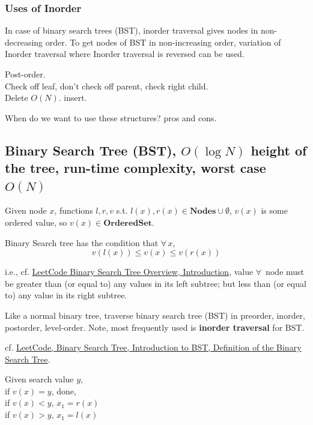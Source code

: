 \documentclass[10pt]{amsart}
\begin{document}
\subsubsection{Uses of Inorder} In case of binary search trees (BST), inorder traversal gives nodes in non-decreasing order. To get nodes of BST in non-increasing order, variation of Inorder traversal where Inorder traversal is reversed can be used.


Post-order. \\
Check off leaf, don't check off parent, check right child. \\

Delete $O(N)$.
insert.

When do we want to use these structures? pros and cons.

\subsection{Binary Search Tree (BST), $O(\log{N})$ height of the tree, run-time complexity, worst case $O(N)$}

Given node $x$, functions $l, r, v$ s.t. $l(x), r(x) \in \textbf{Nodes} \cup \emptyset$, $v(x)$ is some ordered value, so $v(x) \in \textbf{OrderedSet}$. 

Binary Search tree has the condition that $\forall \, x$, 
\[
v(l(x)) \leq v(x) \leq v(r(x))
\]

i.e., cf. \href{https://leetcode.com/explore/learn/card/introduction-to-data-structure-binary-search-tree/}{LeetCode Binary Search Tree Overview, Introduction}, value $\forall \, $ node must be greater than (or equal to) any values in its left subtree; but less than (or equal to) any value in its right subtree.

Like a normal binary tree, traverse binary search tree (BST) in preorder, inorder, postorder, level-order. Note, most frequently used is \textbf{inorder traversal} for BST. 

cf. \href{https://leetcode.com/explore/learn/card/introduction-to-data-structure-binary-search-tree/140/introduction-to-a-bst/1017/}{LeetCode, Binary Search Tree, Introduction to BST, Definition of the Binary Search Tree}.


Given search value $y$, \\
if $v(x) = y$, done, \\
if $v(x) < y$, $x_1 = r(x)$ \\
if $v(x) > y$, $x_1= l(x)$ \\
\end{document}
